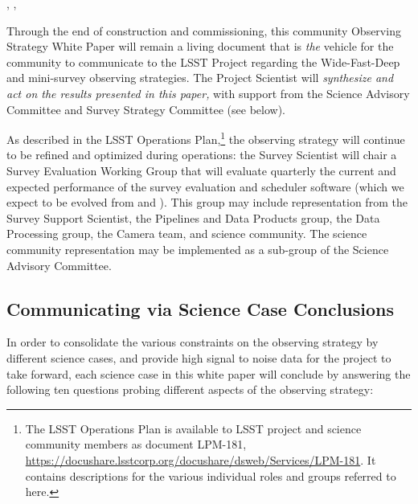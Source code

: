 , , 

Through the end of construction and commissioning, this community
Observing Strategy White Paper will remain a living document that is
{\it the} vehicle for the community to communicate to the LSST Project
regarding the Wide-Fast-Deep and mini-survey observing strategies.
The Project Scientist will {\it synthesize and act on the results
presented in this paper,} with support from the Science Advisory
Committee and Survey Strategy Committee (see below).

As described in the LSST Operations Plan,\footnote{The LSST Operations Plan is available to LSST project and science community members as document LPM-181, \url{https://docushare.lsstcorp.org/docushare/dsweb/Services/LPM-181}. It contains descriptions for the various individual roles and groups referred to here.} the observing
strategy will continue to be refined and optimized during operations:
the Survey Scientist will chair a Survey Evaluation Working Group that
will evaluate quarterly the current and expected performance of the
survey evaluation and scheduler software (which we expect to be evolved from \OpSim and \MAF).
This group may include representation
from the Survey Support Scientist, the Pipelines and Data Products
group, the Data Processing group, the Camera team, and science
community.  The science community representation may be implemented as a
sub-group of the Science Advisory Committee.


\subsection{Communicating via Science Case Conclusions}
\def\secname{intro:caseConclusions}\label{sec:\secname}


In order to consolidate the various constraints on the observing
strategy by different science cases, and provide high signal to noise
data for the project to take forward, each science case in this white paper will conclude by answering the following ten
questions probing different aspects of the observing strategy:

